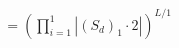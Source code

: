 \documentclass[preview]{standalone}
\begin{document}
\begin{align*}
\quad\\   &= \left(\prod_{i=1}^{1}\left|\left(S_d\right)_{1}\cdot 2\right|\right)^{L/1}
\end{align*}
\end{document}
